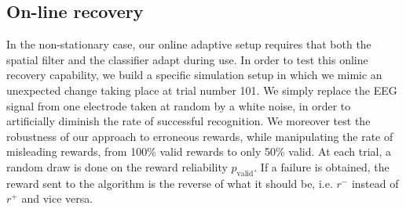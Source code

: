 \documentclass[conference]{IEEEtran}
\begin{document}
\subsection{On-line recovery} \label{sec:sp_filt_rec}

In the non-stationary case, our online adaptive setup requires that both the spatial filter and 
the classifier adapt during  use.
In order to test this online recovery capability, we build a specific simulation setup in which we mimic an unexpected 
change taking place at trial number 101. We simply replace the EEG signal from one electrode taken at random 
by a white noise, in order to artificially diminish the rate of successful recognition.
We moreover test the robustness of our approach to erroneous rewards, while manipulating
the rate of misleading rewards, from 100\% valid rewards to only 50\% valid.
At each trial, a random draw is done on the reward reliability $p_\text{valid}$. If a failure is obtained, 
the reward sent to the algorithm is the reverse of what it should be, i.e. $r^-$ instead of $r^+$ and vice versa.
\end{document}
